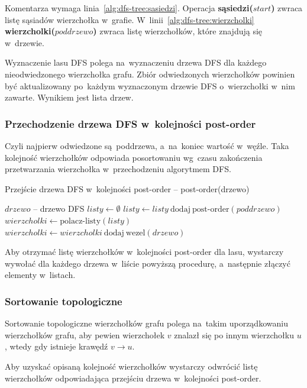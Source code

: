\documentclass[a4paper,12pt]{mwart}
\begin{document}
Komentarza wymaga linia~\ref{alg:dfs-tree:sasiedzi}. Operacja
\textbf{sąsiedzi($start$)} zwraca listę sąsiadów wierzchołka w~grafie.
W~linii~\ref{alg:dfs-tree:wierzcholki} \textbf{wierzcholki($poddrzewo$)} zwraca
listę wierzchołków, które znajdują się w~drzewie.

Wyznaczenie lasu DFS polega na~wyznaczeniu drzewa DFS dla każdego
nieodwiedzonego wierzchołka grafu. Zbiór odwiedzonych wierzchołków powinien być
aktualizowany po~każdym wyznaczonym drzewie DFS o~wierzchołki w~nim zawarte.
Wynikiem jest lista drzew.

\subsubsection{Przechodzenie drzewa DFS w~kolejności post-order}

Czyli najpierw odwiedzone są~poddrzewa, a~na~koniec wartość w~węźle. Taka
kolejność wierzchołków odpowiada posortowaniu wg~czasu zakończenia
przetwarzania wierzchołka w~przechodzeniu algorytmem DFS.

\begin{algorithm}[H]
\caption{Przejście drzewa DFS w~kolejności post-order -- post-order(drzewo)}
\begin{algorithmic}[1]
\Require $drzewo$ -- drzewo DFS
\State $listy \gets \emptyset$
\State $listy \gets listy \ \text{dodaj} \ \text{post-order}(poddrzewo)$
\EndFor
\State $wierzcholki \gets \text{polacz-listy}(listy)$
\State $wierzcholki \gets wierzcholki \ \text{dodaj} \ \text{wezel}(drzewo)$
\State {}
\end{algorithmic}
\end{algorithm}

Aby otrzymać listę wierzchołków w~kolejności post-order dla lasu, wystarczy
wywołać dla każdego drzewa w~liście powyższą procedurę, a~następnie złączyć
elementy w~listach.

\subsubsection{Sortowanie topologiczne}

Sortowanie topologiczne wierzchołków grafu polega na~takim uporządkowaniu
wierzchołków grafu, aby pewien wierzchołek $v$ znalazł się po innym wierzchołku
$u$, wtedy gdy istnieje krawędź $v \to u$.

Aby uzyskać opisaną kolejność wierzchołków wystarczy odwrócić listę
wierzchołków odpowiadająca przejściu drzewa w~kolejności post-order.
\end{document}
